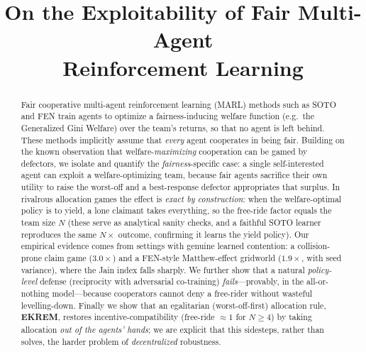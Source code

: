 \documentclass[conference, a4paper]{IEEEtran}
\begin{document}
\title{On the Exploitability of Fair Multi-Agent\\ Reinforcement Learning}

\makeatletter
\def\@IEEEauthorblockNfont{\fontsize{11pt}{13pt}\selectfont}
\def\@IEEEauthorblockAfont{\fontsize{10pt}{12pt}\selectfont}
\makeatother

\author{
}

\maketitle

\begin{abstract}
Fair cooperative multi-agent reinforcement learning (MARL) methods such as SOTO
and FEN train agents to optimize a fairness-inducing welfare function (e.g.\ the
Generalized Gini Welfare) over the team's returns, so that no agent is left
behind. These methods implicitly assume that \emph{every} agent cooperates in
being fair. Building on the known observation that welfare-\emph{maximizing}
cooperation can be gamed by defectors, we isolate and quantify the
\emph{fairness}-specific case: a single self-interested agent can exploit a
welfare-optimizing team, because fair agents sacrifice their own utility to raise
the worst-off and a best-response defector appropriates that surplus. In rivalrous allocation games the effect is
\emph{exact by construction}: when the welfare-optimal policy is to yield, a lone
claimant takes everything, so the free-ride factor equals the team size $N$ (these
serve as analytical sanity checks, and a faithful SOTO learner reproduces the same
$N\times$ outcome, confirming it learns the yield policy). Our empirical evidence
comes from settings with genuine learned contention: a collision-prone claim game
($3.0\times$) and a FEN-style Matthew-effect gridworld ($1.9\times$, with seed
variance), where the Jain index falls sharply. We further show that a natural
\emph{policy-level} defense (reciprocity with adversarial co-training)
\emph{fails}---provably, in the all-or-nothing model---because cooperators cannot
deny a free-rider without wasteful levelling-down. Finally we show that an
egalitarian (worst-off-first) allocation rule, \textbf{EKREM}, restores
incentive-compatibility (free-ride $\approx 1$ for $N\ge 4$) by taking allocation
\emph{out of the agents' hands}; we are explicit that this sidesteps, rather than
solves, the harder problem of \emph{decentralized} robustness.
\end{abstract}
\end{document}
